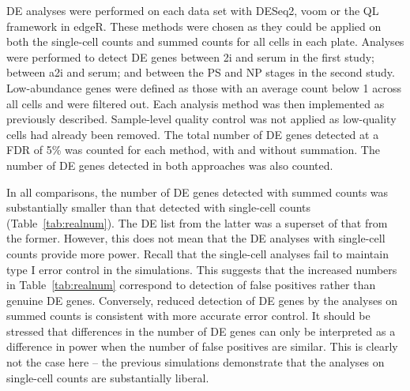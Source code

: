 \documentclass{article}
\begin{document}

DE analyses were performed on each data set with DESeq2, voom or the QL framework in edgeR.
These methods were chosen as they could be applied on both the single-cell counts and summed counts for all cells in each plate. 
Analyses were performed to detect DE genes between 2i and serum in the first study; between a2i and serum; and between the PS and NP stages in the second study.
Low-abundance genes were defined as those with an average count below 1 across all cells and were filtered out.
Each analysis method was then implemented as previously described. 
Sample-level quality control was not applied as low-quality cells had already been removed.
The total number of DE genes detected at a FDR of 5\% was counted for each method, with and without summation.
The number of DE genes detected in both approaches was also counted.

In all comparisons, the number of DE genes detected with summed counts was substantially smaller than that detected with single-cell counts (Table~\ref{tab:realnum}).
The DE list from the latter was a superset of that from the former.
However, this does not mean that the DE analyses with single-cell counts provide more power.
Recall that the single-cell analyses fail to maintain type I error control in the simulations.
This suggests that the increased numbers in Table~\ref{tab:realnum} correspond to detection of false positives rather than genuine DE genes.
Conversely, reduced detection of DE genes by the analyses on summed counts is consistent with more accurate error control.
It should be stressed that differences in the number of DE genes can only be interpreted as a difference in power when the number of false positives are similar.
This is clearly not the case here -- the previous simulations demonstrate that the analyses on single-cell counts are substantially liberal.
\end{document}
